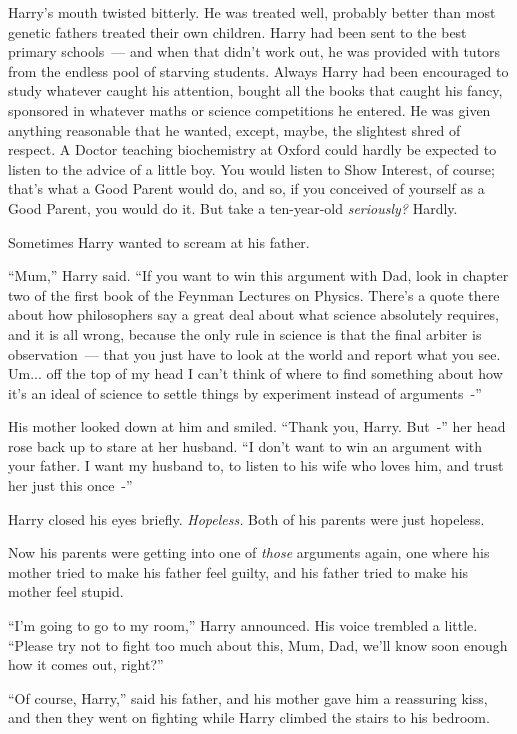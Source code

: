 Harry's mouth twisted bitterly. He was treated well, probably better than most genetic fathers treated their own children. Harry had been sent to the best primary schools~--- and when that didn't work out, he was provided with tutors from the endless pool of starving students. Always Harry had been encouraged to study whatever caught his attention, bought all the books that caught his fancy, sponsored in whatever maths or science competitions he entered. He was given anything reasonable that he wanted, except, maybe, the slightest shred of respect. A Doctor teaching biochemistry at Oxford could hardly be expected to listen to the advice of a little boy. You would listen to Show Interest, of course; that's what a Good Parent would do, and so, if you conceived of yourself as a Good Parent, you would do it. But take a ten-year-old \emph{seriously?} Hardly.

Sometimes Harry wanted to scream at his father.

``Mum,'' Harry said. ``If you want to win this argument with Dad, look in chapter two of the first book of the Feynman Lectures on Physics. There's a quote there about how philosophers say a great deal about what science absolutely requires, and it is all wrong, because the only rule in science is that the final arbiter is observation~--- that you just have to look at the world and report what you see. Um... off the top of my head I can't think of where to find something about how it's an ideal of science to settle things by experiment instead of arguments~-''

His mother looked down at him and smiled. ``Thank you, Harry. But~-'' her head rose back up to stare at her husband. ``I don't want to win an argument with your father. I want my husband to, to listen to his wife who loves him, and trust her just this once~-''

Harry closed his eyes briefly. \emph{Hopeless.} Both of his parents were just hopeless.

Now his parents were getting into one of \emph{those} arguments again, one where his mother tried to make his father feel guilty, and his father tried to make his mother feel stupid.

``I'm going to go to my room,'' Harry announced. His voice trembled a little. ``Please try not to fight too much about this, Mum, Dad, we'll know soon enough how it comes out, right?''

``Of course, Harry,'' said his father, and his mother gave him a reassuring kiss, and then they went on fighting while Harry climbed the stairs to his bedroom.


